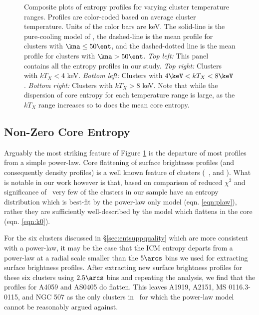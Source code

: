 \begin{center}
\begin{figure}[htp]
    \caption[Montage of entropy profiles for varying cuts in cluster
      temperature.]{Composite plots of entropy profiles for varying
      cluster temperature ranges. Profiles are color-coded based on
      average cluster temperature. Units of the color bars are
      keV. The solid-line is the pure-cooling model of
      \cite{voitbryan}, the dashed-line is the mean profile for
      clusters with $\kna \le 50 \ent$, and the dashed-dotted line is
      the mean profile for clusters with $\kna > 50 \ent$. {\it{Top
          left:}} This panel contains all the entropy profiles in our
      study. {\it{Top right:}} Clusters with $kT_X < 4$
      keV. {\it{Bottom left:}} Clusters with $4\keV < kT_X <
      8\keV$. {\it{Bottom right:}} Clusters with $kT_X > 8$ keV. Note
      that while the dispersion of core entropy for each temperature
      range is large, as the $kT_X$ range increases so to does the
      mean core entropy.}
    \label{fig:splots}
  \end{figure}
\end{center}

\subsection{Non-Zero Core Entropy}
\label{sec:entsuppnonzerok0}

Arguably the most striking feature of Figure \ref{fig:splots} is the
departure of most profiles from a simple power-law. Core flattening of
surface brightness profiles (and consequently density profiles) is a
well known feature of clusters (\eg\ \citealt{1984ApJ...276...38J},
\citealt{1999ApJ...517..627M} and \citealt{2000MNRAS.318..715X}). What
is notable in our work however is that, based on comparison of reduced
$\chi^2$ and significance of \kna\, very few of the clusters in our
sample have an entropy distribution which is best-fit by the power-law
only model (eqn. \ref{eqn:plaw}), rather they are sufficiently
well-described by the model which flattens in the core
(eqn. \ref{eqn:k0}).

For the six clusters discussed in \S\ref{sec:entsuppquality} which are more
consistent with a power-law, it may be the case that the ICM entropy
departs from a power-law at a radial scale smaller than the $5\arcs$
bins we used for extracting surface brightness profiles. After
extracting new surface brightness profiles for these six clusters
using $2.5\arcs$ bins and repeating the analysis, we find that the
profiles for A4059 and AS0405 do flatten. This leaves A1919, A2151, MS
0116.3-0115, and NGC 507 as the only clusters in \accept\ for which
the power-law model cannot be reasonably argued against.

